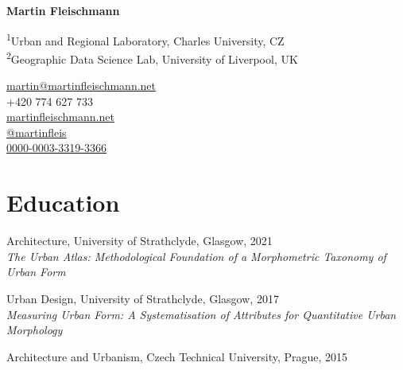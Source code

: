 \documentclass[12pt,a4paper]{report}
\newcommand{\myname}{Martin Fleischmann}
\newcommand{\namefont}[1]{{\normalfont\bfseries\Huge{#1}}}
\begin{document}
    \raggedright{}

    \namefont{\myname}

    \vspace{1em}

    \begin{minipage}[t]{0.6\textwidth}
        \begin{flushleft}
            \textsuperscript{1}Urban and Regional Laboratory, Charles University, CZ \\
            \textsuperscript{2}Geographic Data Science Lab, University of Liverpool, UK \\
        \end{flushleft}
    \end{minipage}%
    \begin{minipage}[t]{0.4\textwidth}
        \begin{flushright}
            \href{mailto:martin@martinfleischmann.net}{martin@martinfleischmann.net} \\
            +420 774 627 733 \\
            \href{https://martinfleischmann.net}{martinfleischmann.net} \\
            \href{https://fosstodon.org/@martinfleis}{@martinfleis} \\
            \href{https://orcid.org/0000-0003-3319-3366}{0000-0003-3319-3366}
        \end{flushright}
    \end{minipage}%


    \section*{Education}

    \begin{tablist}

        \item[Ph.D.] \tab{}Architecture, University of Strathclyde, Glasgow, 2021 \\
                           \textit{The Urban Atlas: Methodological Foundation of a Morphometric Taxonomy of Urban Form}
        \item[MSc.]  \tab{}Urban Design, University of Strathclyde, Glasgow, 2017 \\
                           \textit{Measuring Urban Form: A Systematisation of Attributes for Quantitative Urban Morphology}
        \item[BSc.]  \tab{}Architecture and Urbanism, Czech Technical University, Prague, 2015

    \end{tablist}
\end{document}
